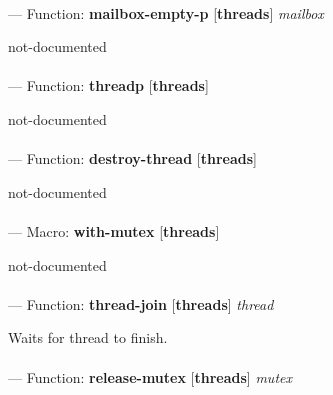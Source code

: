 \paragraph{}
\label{THREADS:MAILBOX-EMPTY-P}
--- Function: \textbf{mailbox-empty-p} [\textbf{threads}] \textit{mailbox}

\begin{adjustwidth}{5em}{5em}
not-documented
\end{adjustwidth}

\paragraph{}
\label{THREADS:THREADP}
--- Function: \textbf{threadp} [\textbf{threads}] \textit{}

\begin{adjustwidth}{5em}{5em}
not-documented
\end{adjustwidth}

\paragraph{}
\label{THREADS:DESTROY-THREAD}
--- Function: \textbf{destroy-thread} [\textbf{threads}] \textit{}

\begin{adjustwidth}{5em}{5em}
not-documented
\end{adjustwidth}

\paragraph{}
\label{THREADS:WITH-MUTEX}
--- Macro: \textbf{with-mutex} [\textbf{threads}] \textit{}

\begin{adjustwidth}{5em}{5em}
not-documented
\end{adjustwidth}

\paragraph{}
\label{THREADS:THREAD-JOIN}
--- Function: \textbf{thread-join} [\textbf{threads}] \textit{thread}

\begin{adjustwidth}{5em}{5em}
Waits for thread to finish.
\end{adjustwidth}

\paragraph{}
\label{THREADS:RELEASE-MUTEX}
--- Function: \textbf{release-mutex} [\textbf{threads}] \textit{mutex}

